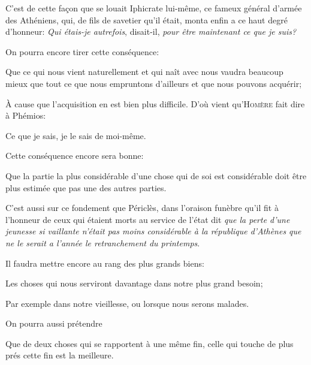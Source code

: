 C'est de cette façon que se louait Iphicrate lui-même, ce fameux général d'armée des Athéniens, qui, de fils de savetier
qu'il était, monta enfin a ce haut degré d'honneur: \emph{Qui étais-je autrefois}, disait-il, \emph{pour être maintenant
ce que je suis?}

\bigbreak

On pourra encore tirer cette conséquence:

\begin{lieu}
  Que ce qui nous vient naturellement et qui naît avec nous vaudra beaucoup mieux que tout ce que nous empruntons d'ailleurs
  et que nous pouvons acquérir;
\end{lieu}

À cause que l'acquisition en est bien plus difficile. D'où vient qu'\textsc{Homère} fait dire à Phémios:

\begin{emphpar}
  Ce que je sais, je le sais de moi-même.
\end{emphpar}

\bigbreak

Cette conséquence encore sera bonne:

\begin{lieu}
  Que la partie la plus considérable d'une chose qui de soi est considérable doit être plus estimée que pas une des autres
  parties.
\end{lieu}

C'est aussi sur ce fondement que Périclès, dans l'oraison funèbre qu'il fit à l'honneur de ceux qui étaient morts
au service de l’état dit \emph{que la perte d'une jeunesse si vaillante n'était pas moins considérable à la république
d'Athènes que ne le serait a l'année le retranchement du printemps}.

\bigbreak

Il faudra mettre encore au rang des plus grands biens:

\begin{lieu}
  Les choses qui nous serviront davantage dans notre plus grand besoin;
\end{lieu}

Par exemple dans notre vieillesse, ou lorsque nous serons malades.

\bigbreak

On pourra aussi prétendre 

\begin{lieu}
  Que de deux choses qui se rapportent à une même fin, celle qui touche de plus prés cette fin est la meilleure.
\end{lieu}

